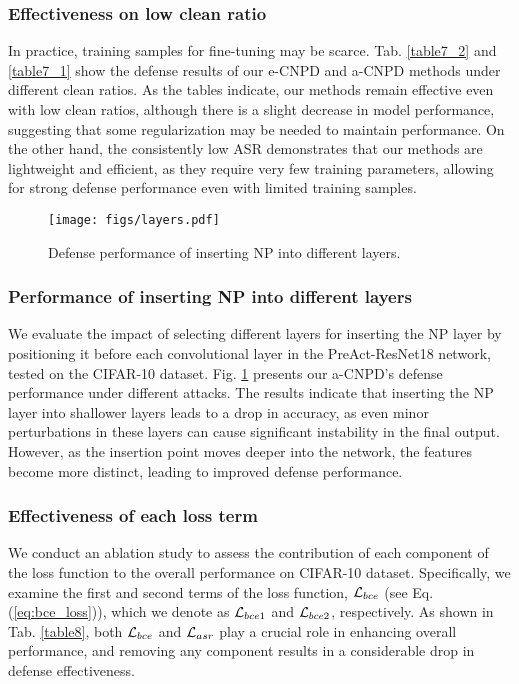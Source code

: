 \subsubsection{Effectiveness on low clean ratio}
In practice, training samples for fine-tuning may be scarce. Tab. \ref{table7_2} and \ref{table7_1} show the defense results of our e-CNPD and a-CNPD methods under different clean ratios. As the tables indicate, our methods remain effective even with low clean ratios, although there is a slight decrease in model performance, suggesting that some regularization may be needed to maintain performance. On the other hand, the consistently low ASR demonstrates that our methods are lightweight and efficient, as they require very few training parameters, allowing for strong defense performance even with limited training samples.

\begin{figure}[h]
\centering
\texttt{[image: figs/layers.pdf]}
\caption{Defense performance of inserting NP into different layers.}
\label{fig:layers}
\end{figure}

\subsubsection{Performance of inserting NP into different layers}
We evaluate the impact of selecting different layers for inserting the NP layer by positioning it before each convolutional layer in the PreAct-ResNet18 network, tested on the CIFAR-10 dataset. Fig. \ref{fig:layers} presents our a-CNPD's defense performance under different attacks. The results indicate that inserting the NP layer into shallower layers leads to a drop in accuracy, as even minor perturbations in these layers can cause significant instability in the final output. However, as the insertion point moves deeper into the network, the features become more distinct, leading to improved defense performance.


\subsubsection{Effectiveness of each loss term}
We conduct an ablation study to assess the contribution of each component of the loss function to the overall performance on CIFAR-10 dataset. Specifically, we examine the first and second terms of the loss function, $\mathcal{L}_{bce}$ (see Eq. (\ref{eq:bce_loss})), which we denote as $\mathcal{L}_{bce1}$ and $\mathcal{L}_{bce2}$, respectively. As shown in Tab. \ref{table8}, both $\mathcal{L}_{bce}$ and $\mathcal{L}_{asr}$ play a crucial role in enhancing overall performance, and removing any component results in a considerable drop in defense effectiveness.

